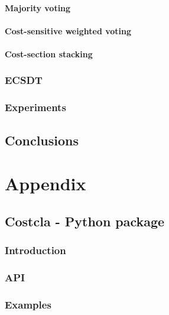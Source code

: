 \documentclass[twoside,openright,titlepage,numbers=noenddot,headinclude,%
               footinclude=true,cleardoublepage=empty,abstractoff,BCOR=5mm,%
               paper=a4,fontsize=11pt,ngerman,american]{scrreprt}
\numberwithin{theorem}{chapter}
\numberwithin{definition}{chapter}
\numberwithin{algorithm}{chapter}
\numberwithin{figure}{chapter}
\numberwithin{table}{chapter}
\numberwithin{equation}{chapter}
\begin{document}
		\subsection{Majority voting}
		\subsection{Cost-sensitive weighted voting}
		\subsection{Cost-section stacking}
	\section{ECSDT}
	\section{Experiments}
		
% 
% 
% 
 
\cleardoublepage
\makeatletter
\def\toclevel@chapter{-1}
\makeatother
\chapter{Conclusions}

\appendix
\cleardoublepage
 \part{Appendix}
 \chapter{Costcla - Python package}
 \section{Introduction}
 \section{API}
 \section{Examples}
\cleardoublepage

\cleardoublepage
\end{document}
